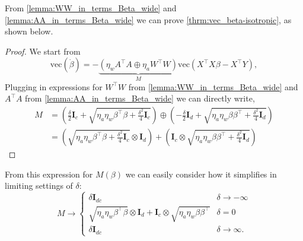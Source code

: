 \documentclass{article}
\theoremstyle{plain}
\theoremstyle{definition}
\theoremstyle{remark}
\begin{document}
From \cref{lemma:WW_in_terms_Beta_wide} and \cref{lemma:AA_in_terms_Beta_wide} we can prove \cref{thrm:vec_beta-isotropic}, as shown below.

\begin{proof}
    We start from
    \begin{equation}
        \mathrm{vec}\left(\dot{\beta}\right) = -\underbrace{\left(\eta_wA^{\intercal}A \oplus \eta_aW^{\intercal}W\right)}_{M} \mathrm{vec}(X^\intercal X\beta - X^\intercal Y),
    \end{equation}
    Plugging in expressions for $W^\intercal W$ from \cref{lemma:WW_in_terms_Beta_wide} and $A^\intercal A$ from \cref{lemma:AA_in_terms_Beta_wide} we can directly write,
    \begin{align}
        M &= \left( \frac{\delta}{2}\mathbf{I}_c + \sqrt{\eta_a \eta_w \beta^{\intercal}  \beta + \frac{\delta^2}{4}\mathbf{I}_c} \right) \oplus \left ( - \frac{\delta}{2}\mathbf{I}_d + \sqrt{\eta_a \eta_w \beta \beta^{\intercal}  + \frac{\delta^2}{4}\mathbf{I}_d} \right)\\
        &= \left(\sqrt{\eta_a \eta_w\beta^{\intercal}\beta + \frac{\delta^2}{4}\mathbf{I}_c}   \otimes \mathbf{I}_d\right ) + \left(\mathbf{I}_c \otimes \sqrt{\eta_a\eta_w \beta \beta^{\intercal} + \frac{\delta^2}{4}\mathbf{I}_d}\right)
    \end{align}
\end{proof}



From this expression for $M(\beta)$ we can easily consider how it simplifies in limiting settings of $\delta$:
\begin{equation}
    M \to
    \begin{cases}
        \delta \mathbf{I}_{dc} &\delta \to -\infty\\
        \sqrt{\eta_a \eta_w\beta^{\intercal}\beta} \otimes \mathbf{I}_d + \mathbf{I}_c \otimes \sqrt{\eta_a\eta_w \beta \beta^{\intercal}} &\delta = 0\\
        \delta \mathbf{I}_{dc} &\delta \to \infty. 
    \end{cases}
\end{equation}
\end{document}
